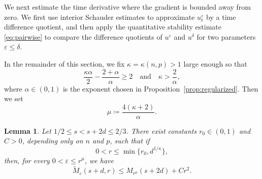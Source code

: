 \documentclass[a4paper,11pt]{amsart}
\theoremstyle{plain}
\newtheorem{lemma}[theorem]{Lemma}
\theoremstyle{definition}
\numberwithin{equation}{section}
\begin{document}
We next estimate the time derivative where the gradient is bounded away from zero. We first use interior Schauder estimates to approximate $u_t^\varepsilon$ by a time difference quotient, and then apply the quantitative stability estimate \eqref{eq:pairwise} to compare the difference quotients of $u^\varepsilon$ and $u^\delta$ for two parameters $\varepsilon \leq \delta$.

In the remainder of this section, we fix $\kappa=\kappa(n, p)>1$ large enough so that
\begin{equation*}
    \frac{\kappa\alpha}{2}-\frac{2+\alpha}{\alpha}\geq2 \quad \text{and}\quad
    \kappa>\frac2\alpha,
\end{equation*}
where $\alpha \in (0,1)$ is the exponent chosen in Proposition~\ref{prop:regularized}. Then we set
\begin{equation*}
\mu\coloneqq\frac{4(\kappa+2)}{\alpha}.
\end{equation*}

\begin{lemma}\label{lem:noncritical}
Let $1/2\leq s<s+2d\leq2/3$.
There exist constants $r_0\in(0,1)$ and $C>0$, depending only on $n$ and $p$, such that if
\begin{equation*}
0<r\leq\min\{r_0,d^{1/\kappa}\},
\end{equation*}
then, for every $0<\varepsilon\leq r^{\mu}$, we have
\begin{equation}\label{eq:noncritical}
\widetilde M_\varepsilon(s+d,r)
\leq M_{r^{\mu}}(s+2d)+Cr^2.
\end{equation}
\end{lemma}
\end{document}
